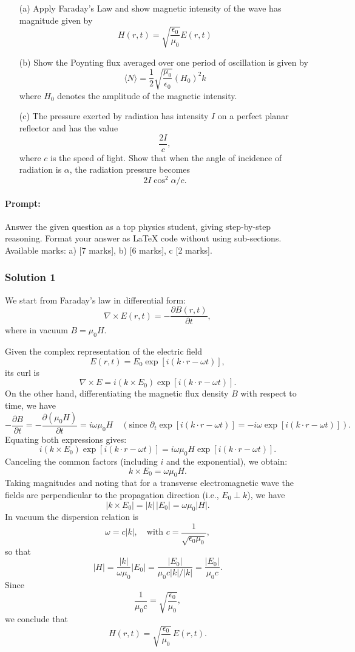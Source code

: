 \documentclass{article}
\begin{document}
\begin{enumerate}
    \item[(a)] Apply Faraday’s Law and show magnetic intensity of the wave has magnitude given by
    \[
    H(r, t) = \sqrt{\frac{\epsilon_0}{\mu_0}} E(r, t)
    \]

    \item[(b)] Show the Poynting flux averaged over one period of oscillation is given by
    \[
    \langle N \rangle = \frac{1}{2} \sqrt{\frac{\mu_0}{\epsilon_0}} (H_0)^2 \hat{k}
    \]
    where \(H_0\) denotes the amplitude of the magnetic intensity.

    \item[(c)] The pressure exerted by radiation has intensity \(I\) on a perfect planar reflector and has the value
    \[
    \frac{2I}{c},
    \]
    where \(c\) is the speed of light. Show that when the angle of incidence of radiation is \(\alpha\), the radiation pressure becomes
    \[
    2I \cos^2 \alpha / c.
    \]
\end{enumerate}


\paragraph{Prompt: \\} 
Answer the given question as a top physics student, giving step-by-step reasoning. Format your answer as LaTeX code without using sub-sections. Available marks: a) [7 marks], b) [6 marks], c [2 marks].

\subsubsection{Solution 1}
We start from Faraday’s law in differential form:
\[
\nabla \times E(r,t) = -\frac{\partial B(r,t)}{\partial t},
\]
where in vacuum \(B = \mu_0 H\).

Given the complex representation of the electric field
\[
E(r,t) = E_0 \exp[i(k\cdot r - \omega t)],
\]
its curl is
\[
\nabla \times E = i(k \times E_0) \exp[i(k\cdot r - \omega t)].
\]
On the other hand, differentiating the magnetic flux density \(B\) with respect to time, we have
\[
-\frac{\partial B}{\partial t} = -\frac{\partial (\mu_0 H)}{\partial t} = i\omega \mu_0 H \quad (\text{since } \partial_t \exp[i(k\cdot r-\omega t)] = -i\omega \exp[i(k\cdot r-\omega t)]).
\]
Equating both expressions gives:
\[
i(k \times E_0) \exp[i(k\cdot r - \omega t)] = i\omega \mu_0 H \exp[i(k\cdot r - \omega t)].
\]
Canceling the common factors (including \(i\) and the exponential), we obtain:
\[
k \times E_0 = \omega \mu_0 H.
\]
Taking magnitudes and noting that for a transverse electromagnetic wave the fields are perpendicular to the propagation direction (i.e., \(E_0 \perp k\)), we have
\[
|k \times E_0| = |k|\,|E_0| = \omega \mu_0 |H|.
\]
In vacuum the dispersion relation is
\[
\omega = c|k|, \quad \text{with } c=\frac{1}{\sqrt{\epsilon_0\mu_0}},
\]
so that
\[
|H| = \frac{|k|}{\omega \mu_0} |E_0| = \frac{|E_0|}{\mu_0 c|k|/|k|} = \frac{|E_0|}{\mu_0 c}.
\]
Since
\[
\frac{1}{\mu_0 c} = \sqrt{\frac{\epsilon_0}{\mu_0}},
\]
we conclude that
\[
H(r,t) = \sqrt{\frac{\epsilon_0}{\mu_0}}\,E(r,t).
\]
\end{document}
